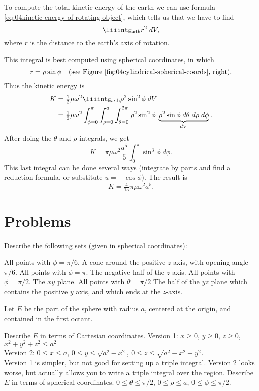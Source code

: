 To compute the total kinetic energy of the earth we can use formula
\eqref{eq:04kinetic-energy-of-rotating-object}, which tells us that we
have to find
\[
\liiint_{\sf Earth} r^2 \; dV,
\]
where $r$ is the distance to the earth's axis of rotation.

This integral is best computed using spherical coordinates, in which
\[
r = \rho\sin\phi   \quad\text{(see
Figure~\ref{fig:04cylindrical-spherical-coords}, right)}.
\]
Thus the kinetic energy is 
\begin{align*}
  K &= \tfrac12\mu\omega^2 \liiint_{\sf Earth} \rho^2\sin^2\phi \;
  dV\\
  &=
  \tfrac12\mu\omega^2 
  \int_{\phi=0}^\pi \int_{\rho=0}^a \int_{\theta=0}^{2\pi}
  \rho^2\sin^2\phi\;
  \underbrace{\rho^2 \sin\phi \; d\theta\; d\rho\; d\phi}_{dV}.
\end{align*}
After doing the $\theta$ and $\rho$ integrals, we get
\[
K = \pi\mu\omega^2 \frac{a^5}5
\int_0^\pi \sin^3\phi \; d\phi.
\]
This last integral can be done several ways (integrate by parts and
find a reduction formula, or substitute $u = -\cos \phi$).  The result is  
\[
K = \tfrac4{15} \pi \mu \omega^2 a^5.
\]



\section{Problems}  
\problemfont


\problem Describe the following sets  
(given in spherical coordinates):

\subprob All points with $\phi = \pi/6$.
\answer
A cone around the positive $z$ axis, with opening angle $\pi/6.$ 
\endanswer
\subprob All points with $\phi = \pi$.
\answer
The negative half of the $z$ axis.
\endanswer
\subprob All points with $\phi = \pi/2$.
\answer
The $xy$ plane.
\endanswer
\subprob All points with $\theta=\pi/2$ 
\answer
The half of the $yz$ plane which contains the positive $y$ axis, and
which ends at the $z$-axis.
\endanswer

\problem Let $E$ be the part of the sphere with radius $a$, centered at the origin, and contained in the first octant.

\subprob Describe $E$ in terms of Cartesian coordinates.
\answer
Version 1:  $x\ge0$, $y\ge0$, $z\ge0$, $x^2+y^2+z^2\le a^2$\\
Version 2:  $0\le x\le a$, $0\le y\le \sqrt{a^2-x^2}$, $0\le z\le \sqrt{a^2-x^2-y^2}$.\\
Version 1 is simpler, but not good for setting up a triple integral.  Version 2 looks worse, but actually allows you to write a triple integral over the region.
\endanswer
\subprob Describe $E$ in terms of spherical coordinates. 
\answer
$0\leq \theta\le\pi/2$, $0\le \rho\le a$, $0\le\phi\le\pi/2$.
\endanswer

